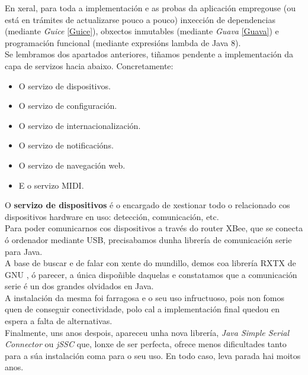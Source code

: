    En xeral, para toda a implementación e as probas da aplicación empregouse
   (ou está en trámites de actualizarse pouco a pouco) inxección de dependencias
   (mediante \textit{Guice} \ref{Guice}), obxectos inmutables (mediante
   \textit{Guava} \ref{Guava}) e programación funcional (mediante expresións
   lambda de Java 8). \\
   
   Se lembramos dos apartados anteriores, tiñamos pendente a implementación da
   capa de servizos hacia abaixo. Concretamente:
   
   \begin{itemize}
    \item O servizo de dispositivos.
    \item O servizo de configuración.
    \item O servizo de internacionalización.
    \item O servizo de notificacións.
    \item O servizo de navegación web.
    \item E o servizo MIDI.
   \end{itemize}
   
   O \textbf{servizo de dispositivos} é o encargado de xestionar todo o
   relacionado cos dispositivos hardware en uso: detección, comunicación,
   etc. \\
   
   Para poder comunicarnos cos dispositivos a través do router XBee, que se
   conecta ó ordenador mediante USB, precisabamos dunha librería de comunicación
   serie para Java. \\
   
   A base de buscar e de falar con xente do mundillo, demos coa librería RXTX de
   GNU \cite{RXTX}, ó parecer, a única dispoñible daquelas e constatamos que a
   comunicación serie é un dos grandes olvidados en Java. \\
   
   A instalación da mesma foi farragosa e o seu uso infructuoso, pois non fomos
   quen de conseguir conectividade, polo cal a implementación final quedou en
   espera a falta de alternativas. \\
   
   Finalmente, uns anos despois, apareceu unha nova librería,
   \textit{Java Simple Serial Connector} ou \textit{jSSC} \cite{jSSC} que, lonxe
   de ser perfecta, ofrece menos dificultades tanto para a súa instalación coma
   para o seu uso. En todo caso, leva parada hai moitos anos. \\
   

